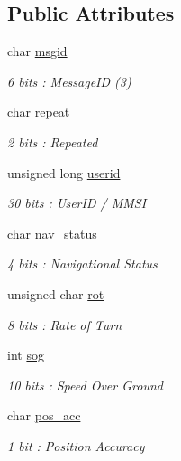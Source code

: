 \subsection*{Public Attributes}
\begin{DoxyCompactItemize}
\item 
char \mbox{\hyperlink{structaismsg__3_a2c58a9bee5da3b603250fff36632cf02}{msgid}}
\begin{DoxyCompactList}\small\item\em 6 bits \+: Message\+ID (3) \end{DoxyCompactList}\item 
char \mbox{\hyperlink{structaismsg__3_ac94b047f6357e9e54468b2b55405e33c}{repeat}}
\begin{DoxyCompactList}\small\item\em 2 bits \+: Repeated \end{DoxyCompactList}\item 
unsigned long \mbox{\hyperlink{structaismsg__3_a663a6cb942ad6e9a61427a85058536f6}{userid}}
\begin{DoxyCompactList}\small\item\em 30 bits \+: User\+ID / M\+M\+SI \end{DoxyCompactList}\item 
char \mbox{\hyperlink{structaismsg__3_acb18dee67e0b9279ccfe8ddd9d1a5f70}{nav\+\_\+status}}
\begin{DoxyCompactList}\small\item\em 4 bits \+: Navigational Status \end{DoxyCompactList}\item 
unsigned char \mbox{\hyperlink{structaismsg__3_ace79e407574ce02acb2da6f36fcbaf65}{rot}}
\begin{DoxyCompactList}\small\item\em 8 bits \+: Rate of Turn \end{DoxyCompactList}\item 
int \mbox{\hyperlink{structaismsg__3_a12cc72d13a2a323cb565971cba225693}{sog}}
\begin{DoxyCompactList}\small\item\em 10 bits \+: Speed Over Ground \end{DoxyCompactList}\item 
char \mbox{\hyperlink{structaismsg__3_a811fb76a7e21962f43c35c29cc0f7d91}{pos\+\_\+acc}}
\begin{DoxyCompactList}\small\item\em 1 bit \+: Position Accuracy \end{DoxyCompactList}\item 

\end{DoxyCompactItemize}
